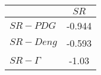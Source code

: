 \begin{tabular}{l|c}
\toprule
{} &   $SR$ \\
\midrule
\textbf{$SR-PDG$   } & -0.944 \\
\textbf{$SR-Deng$  } & -0.593 \\
\textbf{$SR-\Gamma$} &  -1.03 \\
\bottomrule
\end{tabular}
